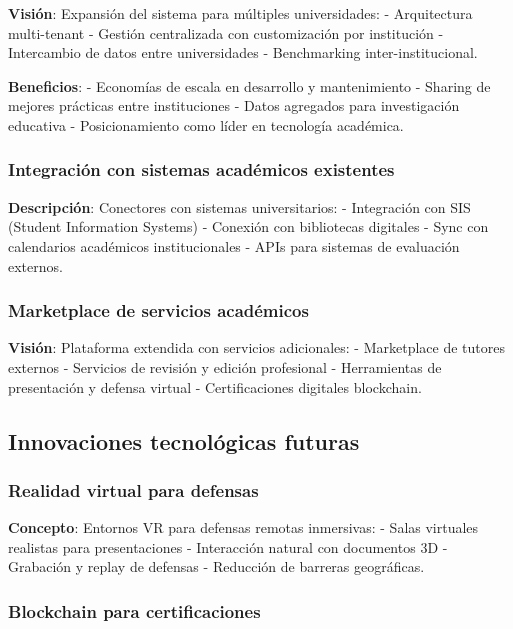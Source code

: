 \documentclass[12pt,a4paper,oneside]{report}
\begin{document}
{\textbf{Visión}: Expansión del sistema para múltiples universidades: -
Arquitectura multi-tenant - Gestión centralizada con customización por
institución - Intercambio de datos entre universidades - Benchmarking
inter-institucional.

\textbf{Beneficios}: - Economías de escala en desarrollo y mantenimiento
- Sharing de mejores prácticas entre instituciones - Datos agregados
para investigación educativa - Posicionamiento como líder en tecnología
académica.

\subsubsection{Integración con sistemas académicos
existentes}\label{integraciuxf3n-con-sistemas-acaduxe9micos-existentes}

\textbf{Descripción}: Conectores con sistemas universitarios: -
Integración con SIS (Student Information Systems) - Conexión con
bibliotecas digitales - Sync con calendarios académicos institucionales
- APIs para sistemas de evaluación externos.

\subsubsection{Marketplace de servicios
académicos}\label{marketplace-de-servicios-acaduxe9micos}

\textbf{Visión}: Plataforma extendida con servicios adicionales: -
Marketplace de tutores externos - Servicios de revisión y edición
profesional - Herramientas de presentación y defensa virtual -
Certificaciones digitales blockchain.

\subsection{Innovaciones tecnológicas
futuras}\label{innovaciones-tecnoluxf3gicas-futuras}

\subsubsection{Realidad virtual para
defensas}\label{realidad-virtual-para-defensas}

\textbf{Concepto}: Entornos VR para defensas remotas inmersivas: - Salas
virtuales realistas para presentaciones - Interacción natural con
documentos 3D - Grabación y replay de defensas - Reducción de barreras
geográficas.

\subsubsection{Blockchain para
certificaciones}\label{blockchain-para-certificaciones}

}
\end{document}
